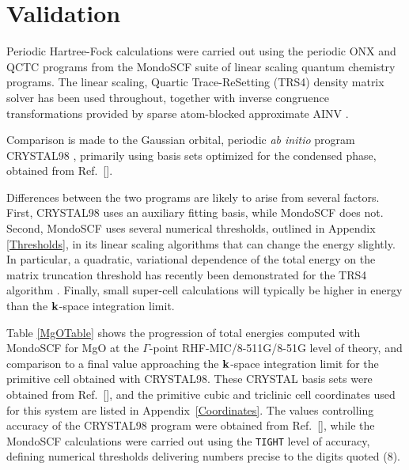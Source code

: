 \documentclass[prb,aps,nobibnotes,twocolumn,doublespace,twocolumngrid,superbib,showpacs]{revtex4}
\begin{document}
\section{Validation} \label{validation}

Periodic Hartree-Fock calculations were carried out using the periodic {\sc ONX} and {\sc QCTC}
programs from the {\sc MondoSCF} suite of linear scaling quantum chemistry programs.
The linear scaling, Quartic Trace-ReSetting ({\sc TRS4}) density matrix solver has been used throughout, 
together with inverse congruence transformations provided by sparse atom-blocked approximate 
{\sc AINV} \cite{MBenzi01}.  

Comparison is made to the Gaussian orbital, periodic {\em ab initio} program {\sc CRYSTAL98} \cite{CRYSTAL98}, 
primarily using basis sets optimized for the condensed phase, obtained  from Ref.~[].

Differences between the two programs are likely to arise from several factors.  First, {\sc CRYSTAL98}
uses an auxiliary fitting basis, while {\sc MondoSCF} does not.  Second, {\sc MondoSCF} uses several 
numerical thresholds, outlined in Appendix \ref{Thresholds}, in its linear scaling algorithms that can 
change the energy slightly.   In particular, a quadratic, variational dependence of the total energy
on the  matrix truncation threshold has recently been demonstrated for the {\sc TRS4} algorithm 
\cite{ANiklasson03}.  Finally, small super-cell calculations will typically be higher in energy than the 
${\bf k}$-space integration limit.  

Table \ref{MgOTable} shows the progression of total energies computed with {\sc MondoSCF} 
for MgO at the $\Gamma$-point RHF-MIC/8-511G/8-51G level of theory, and comparison to
a final value approaching the ${\bf k}$-space integration limit for the primitive cell obtained 
with {\sc CRYSTAL98}.   These {\sc CRYSTAL} basis sets were obtained from Ref.~[],
and the primitive cubic and triclinic cell coordinates used for this system are listed in 
Appendix~\ref{Coordinates}.   The values controlling accuracy of the {\sc CRYSTAL98} program were 
obtained from Ref.~[], while the {\sc MondoSCF} calculations were 
carried out using the {\tt TIGHT} level of accuracy, defining numerical thresholds 
delivering numbers precise to the digits quoted (8). 
\end{document}

